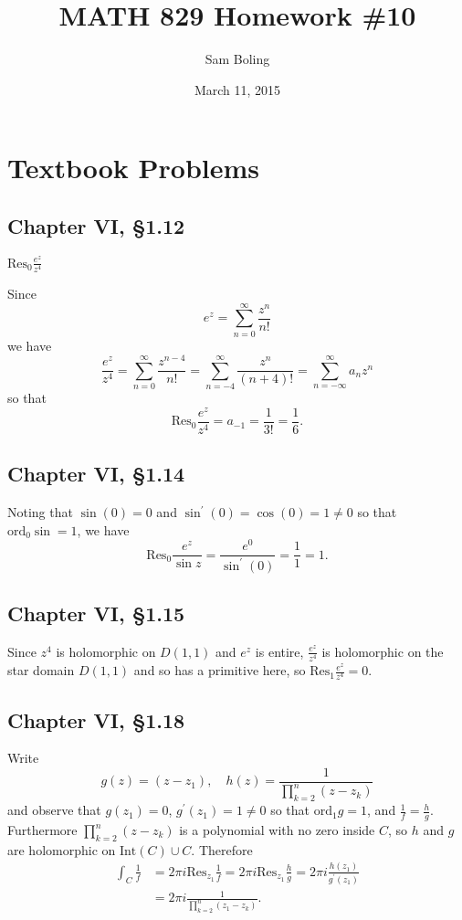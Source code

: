 \documentclass{article}
\title{MATH 829 Homework \#10}
\date{March 11, 2015}
\author{Sam Boling}
\newcommand\Res{\mathrm{Res}}
\newcommand\ord{\mathrm{ord}}
\newcounter{Problem}
\begin{document}
\begin{titlepage}
\maketitle
\end{titlepage}

\section{Textbook Problems}
\subsection*{Chapter VI, \S1.12}
$\Res_0 \frac{e^z}{z^4}$

Since
$$
e^z = \sum_{n=0}^\infty \frac{z^n}{n!}
$$
we have
$$
  \frac{e^z}{z^4}
= \sum_{n=0}^\infty \frac{z^{n-4}}{n!}
= \sum_{n=-4}^\infty \frac{z^n}{(n+4)!}
= \sum_{n=-\infty}^\infty a_n z^n
$$
so that 
$$
  \Res_0 \frac{e^z}{z^4} 
= a_{-1} 
= \frac{1}{3!} 
= \frac{1}{6}.
$$

\subsection*{Chapter VI, \S1.14}
Noting that $\sin(0) = 0$ and 
$\sin^\prime(0) = \cos(0) = 1 \neq 0$
so that $\ord_0 \sin = 1$, we have 
$$
  \Res_0 \frac{e^z}{\sin z}
= \frac{e^0}{\sin^\prime(0)}
= \frac{1}{1}
= 1.
$$

\subsection*{Chapter VI, \S1.15}
Since $z^4$ is holomorphic on $D(1, 1)$ and
$e^z$ is entire, $\frac{e^z}{z^4}$ is holomorphic on the
star domain $D(1,1)$ and so has a primitive here,
so $\Res_1 \frac{e^z}{z^4} = 0$.

\subsection*{Chapter VI, \S1.18}
Write 
$$
g(z) = (z - z_1), \quad
h(z) = \frac{1}{\prod_{k=2}^n (z - z_k)}
$$
and observe that $g(z_1) = 0$, 
$g^\prime(z_1) = 1 \neq 0$ so that $\ord_1 g = 1$,
and $\frac{1}{f} = \frac{h}{g}$. Furthermore
$\prod_{k=2}^n (z - z_k)$ is a polynomial with no zero inside 
$C$, so $h$ and $g$ are holomorphic on $\mathrm{Int}(C) \cup C$.
Therefore 
\begin{align*}
   \int_C \frac{1}{f} 
&= 2 \pi i \Res_{z_1} \frac{1}{f}
 = 2 \pi i \Res_{z_1} \frac{h}{g}
 = 2 \pi i \frac{h(z_1)}{g^\prime(z_1)} \\
&= 2 \pi i \frac{1}{\prod_{k=2}^n (z_1 - z_k)}.
\end{align*}
\end{document}
